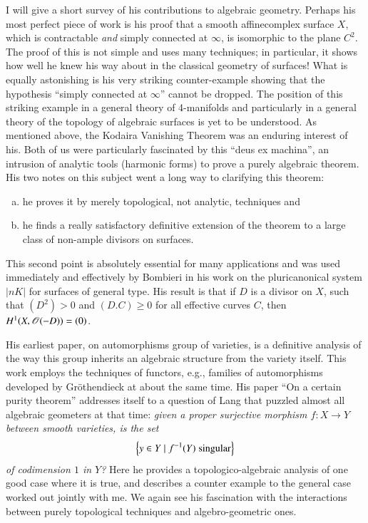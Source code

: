 I will give a short survey of his contributions to algebraic geometry. 
Perhaps his most perfect piece of work is his proof that a smooth 
affine\pageoriginale complex surface $X$, which is contractable 
\emph{and} simply connected at $\infty$, is isomorphic to the plane 
$C^2$. The proof of this is not simple and uses many techniques; in 
particular, it shows how well he knew his way about in the classical 
geometry of surfaces! What is equally astonishing is his very striking 
counter-example showing that the hypothesis ``simply connected at 
$\infty$'' cannot be dropped. The position of this striking example in 
a general theory of 4-manifolds and particularly in a general theory 
of the topology of algebraic surfaces is yet to be understood. As 
mentioned above, the Kodaira Vanishing Theorem was an enduring 
interest of his. Both of us were particularly fascinated by this 
``deus ex machina'', an intrusion of analytic tools (\ie harmonic 
forms) to prove a purely algebraic theorem. His two notes on this 
subject went a long way to clarifying this theorem:
\begin{enumerate}[(a)]
\item he proves it by merely topological, not analytic, techniques and 
\item he finds a really satisfactory definitive extension of the 
theorem to a large class of non-ample divisors on surfaces. 
\end{enumerate}
This second point is absolutely essential for many applications and 
was used immediately and effectively by Bombieri in his work on the 
pluricanonical system $|nK|$ for surfaces of general type. His result 
is that if $D$ is a divisor on $X$, such that $(D^2)>0$ and $(D.C)\geq 
0$ for all effective curves $C$, then $H^1(X,\mathscr{O}(-D))=(0)$. 

His earliest paper, on automorphisms group of varieties, is a 
definitive analysis of the way this group inherits an algebraic 
structure from the variety itself. This work employs the techniques of 
functors, e.g., families of automorphisms developed by Gr\"othendieck at 
about the same time. His paper ``On a certain purity theorem'' 
addresses itself to a question of Lang that puzzled almost all 
algebraic geometers at that time: \emph{given a proper surjective 
morphism $f:X\to Y$ between smooth varieties, is the set
$$
\left\{{y\in Y\mid f^{-1}(Y)\;\text{singular}}\right\}
$$
of codimension $1$ in $Y$?} Here he provides a topologico-algebraic 
analysis of one good case where it is true, and describes a counter 
example to the general case worked out jointly with me. We again see 
his fascination with the interactions between purely topological 
techniques and algebro-geometric ones.

